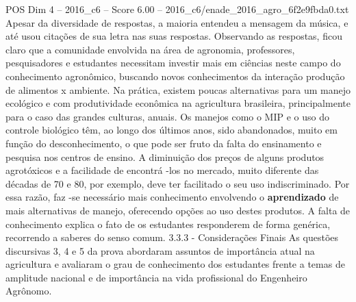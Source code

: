 \begin{textsample}{POS Dim 4 – 2016\_c6 – Score 6.00 – 2016\_c6/enade\_2016\_agro\_6f2e9fbda0.txt}
Apesar da diversidade de respostas, a maioria entendeu a mensagem da música, e até usou citações de sua letra nas suas respostas.
Observando as respostas, ficou claro que a comunidade envolvida na área de agronomia, professores, pesquisadores e estudantes necessitam investir mais em ciências neste campo do conhecimento agronômico, buscando novos conhecimentos da interação produção de alimentos x ambiente.
Na prática, existem poucas alternativas para um manejo ecológico e com produtividade econômica na agricultura brasileira, principalmente para o caso das grandes culturas, anuais.
Os manejos como o MIP e o uso do controle biológico têm, ao longo dos últimos anos, sido abandonados, muito em função do desconhecimento, o que pode ser fruto da falta do ensinamento e pesquisa nos centros de ensino.
A diminuição dos preços de alguns produtos agrotóxicos e a facilidade de encontrá -los no mercado, muito diferente das décadas de 70 e 80, por exemplo, deve ter facilitado o seu uso indiscriminado.
Por essa razão, faz -se necessário mais conhecimento envolvendo o \textbf{aprendizado} de mais alternativas de manejo, oferecendo opções ao uso destes produtos.
A falta de conhecimento explica o fato de os estudantes responderem de forma genérica, recorrendo a saberes do senso comum. 3.3.3 - Considerações Finais As questões discursivas 3, 4 e 5 da prova abordaram assuntos de importância atual na agricultura e avaliaram o grau de conhecimento dos estudantes frente a temas de amplitude nacional e de importância na vida profissional do Engenheiro Agrônomo.

\end{textsample}
